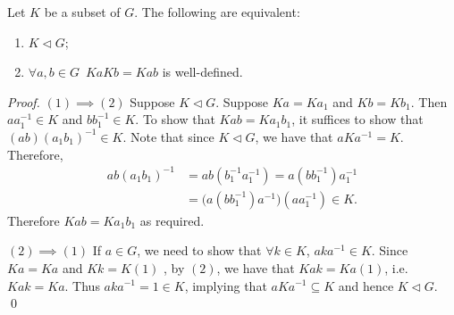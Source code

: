 \begin{lemma}
\label{lemma:multiplication_of_cosets_of_normal_subgroups}
  Let $K$ be a subset of $G$. The following are equivalent:
  \begin{enumerate}
    \item $K \triangleleft G$;
    \item $\forall a, b \in G \enspace Ka Kb = Kab$ is well-defined.
  \end{enumerate}
\end{lemma}

\begin{proof}
  $(1) \implies (2)$ Suppose $K \triangleleft G$. Suppose $Ka = Ka_1$ and $Kb = Kb_1$. Then $aa_1^{-1} \in K$ and $bb_1^{-1} \in K$. To show that $Kab = Ka_1 b_1$, it suffices to show that $(ab) (a_1 b_1)^{-1} \in K$. Note that since $K \triangleleft G$, we have that $aKa^{-1} = K$. Therefore,
  \begin{align*}
    ab(a_1 b_1)^{-1} &= ab (b_1^{-1} a_1^{-1}) = a(bb_1^{-1}) a_1^{-1} \\
      &= \big(a ( bb_1^{-1} ) a^{-1}\big) (a a_1^{-1}) \in K.
  \end{align*}
  Therefore $Kab = Ka_1 b_1$ as required.

  \noindent $(2) \implies (1)$ If $a \in G$, we need to show that $\forall k \in K$, $aka^{-1} \in K$. Since $Ka = Ka$ and $Kk = K(1)$ , by $(2)$, we have that $Kak = Ka(1)$, i.e. $Kak = Ka$. Thus $aka^{-1} = 1 \in K$, implying that $aKa^{-1} \subseteq K$ and hence $K \triangleleft G$. \qed
\end{proof}



